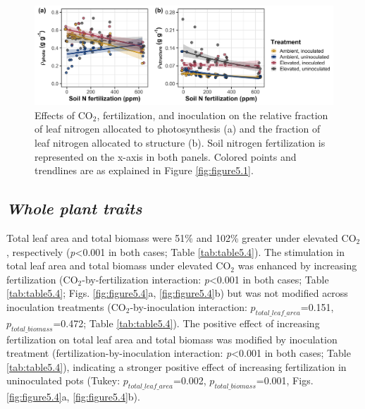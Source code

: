 \newpage
\begin{landscape}
    \begin{figure}
        \centering
        \includegraphics[width=\linewidth]{ch5_NxCO2xI/figs/NxCO2xI_fig3_propN.png}
        \caption[Effects of CO$_2$, fertilization, and inoculation on the relative fraction of leaf nitrogen allocated to photosynthesis and the fraction of leaf nitrogen allocated to structure]{Effects of CO$_2$, fertilization, and inoculation on the relative fraction of leaf nitrogen allocated to photosynthesis (a) and the fraction of leaf nitrogen allocated to structure (b). Soil nitrogen fertilization is represented on the x-axis in both panels. Colored points and trendlines are as explained in Figure \ref{fig:figure5.1}.}
        \label{fig:figure5.3}
    \end{figure}
\end{landscape}
\clearpage

\subsection{\textit{Whole plant traits}}
\noindent Total leaf area and total biomass were 51\% and 102\% greater under elevated CO$_2$, respectively (\textit{p}<0.001 in both cases; Table \ref{tab:table5.4}). The stimulation in total leaf area and total biomass under elevated CO$_2$ was enhanced by increasing fertilization (CO$_2$-by-fertilization interaction: \textit{p}<0.001 in both cases; Table \ref{tab:table5.4}; Figs. \ref{fig:figure5.4}a, \ref{fig:figure5.4}b) but was not modified across inoculation treatments (CO$_2$-by-inoculation interaction: $p_{total\_leaf\_area}$=0.151, $p_{total\_biomass}$=0.472; Table \ref{tab:table5.4}). The positive effect of increasing fertilization on total leaf area and total biomass was modified by inoculation treatment (fertilization-by-inoculation interaction: \textit{p}<0.001 in both cases; Table \ref{tab:table5.4}), indicating a stronger positive effect of increasing fertilization in uninoculated pots (Tukey: $p_{total\_leaf\_area}$=0.002, $p_{total\_biomass}$=0.001, Figs. \ref{fig:figure5.4}a, \ref{fig:figure5.4}b).

